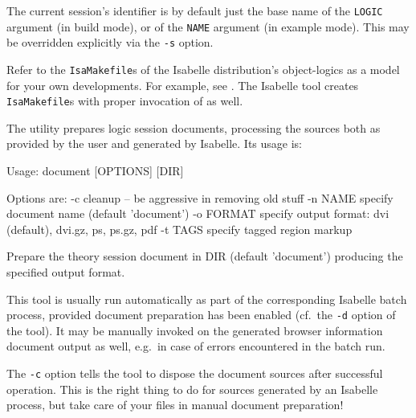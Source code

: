 \begin{isabellebody}
\begin{isamarkuptext}
  The current session's identifier is by default just the base name of
  the \verb|LOGIC| argument (in build mode), or of the \verb|NAME| argument (in example mode). This may be overridden explicitly
  via the \verb|-s| option.%
\end{isamarkuptext}%
\isamarkuptrue%
%
\isamarkuptrue%
%
\begin{isamarkuptext}%
Refer to the \verb|IsaMakefile|s of the Isabelle distribution's
  object-logics as a model for your own developments.  For example,
  see \hyperlink{file.~~/src/FOL/IsaMakefile}{\mbox{}}.  The Isabelle \hyperlink{tool.mkdir}{\mbox{}} tool creates \verb|IsaMakefile|s with proper invocation
  of \hyperlink{tool.usedir}{\mbox{}} as well.%
\end{isamarkuptext}%
\isamarkuptrue%
%
\isamarkuptrue%
%
\begin{isamarkuptext}%
The \hypertarget{tool.document}{\hyperlink{tool.document}{\mbox{}}} utility prepares logic session documents,
  processing the sources both as provided by the user and generated by
  Isabelle.  Its usage is:
\begin{ttbox}
Usage: document [OPTIONS] [DIR]

  Options are:
    -c           cleanup -- be aggressive in removing old stuff
    -n NAME      specify document name (default 'document')
    -o FORMAT    specify output format: dvi (default), dvi.gz, ps,
                 ps.gz, pdf
    -t TAGS      specify tagged region markup

  Prepare the theory session document in DIR (default 'document')
  producing the specified output format.
\end{ttbox}
  This tool is usually run automatically as part of the corresponding
  Isabelle batch process, provided document preparation has been
  enabled (cf.\ the \verb|-d| option of the \hyperlink{tool.usedir}{\mbox{}}
  tool).  It may be manually invoked on the generated browser
  information document output as well, e.g.\ in case of errors
  encountered in the batch run.

  \medskip The \verb|-c| option tells the \hyperlink{tool.document}{\mbox{}} tool
  to dispose the document sources after successful operation.  This is
  the right thing to do for sources generated by an Isabelle process,
  but take care of your files in manual document preparation!


\end{isamarkuptext}
\end{isabellebody}
